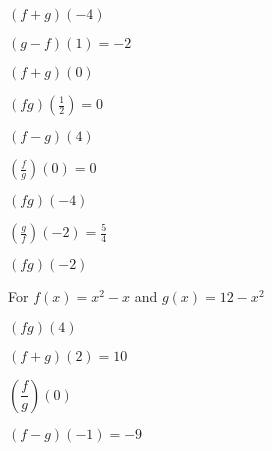 \documentclass{ximera}
\begin{document}
\begin{question}
$(f + g)(-4)$
\begin{solution}
$(g-f)(1) = -2$

\end{solution}

\end{question}

\begin{question}
$(f + g)(0)$
\begin{solution}
$(fg)\left(\frac{1}{2}\right) = 0$
\end{solution}

\end{question}

\begin{question}
$(f- g)(4)$

\begin{solution}
$\left(\frac{f}{g}\right)(0) = 0$
\end{solution}

\end{question}

\begin{question}
$(fg)(-4)$
\begin{solution}
$\left(\frac{g}{f}\right)\left(-2\right) = \frac{5}{4}$

\end{solution}

\end{question}

\begin{question}
$(fg)(-2)$
\begin{solution}
For  $f(x) = x^2 - x$ and  $g(x) = 12-x^2$


\end{solution}

\end{question}

\begin{question}
$(fg)(4)$

\begin{solution}
$(f+g)(2) = 10$
\end{solution}

\end{question}

\begin{question}
$\left(\dfrac{f}{g}\right)(0)$
\begin{solution}
$(f-g)(-1) = -9$
\end{solution}

\end{question}
\end{document}
